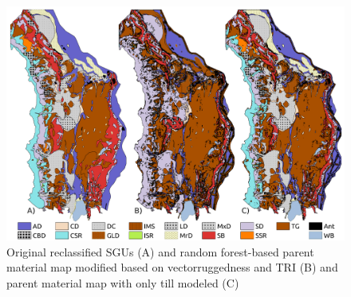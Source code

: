 \documentclass[preprint,12pt,authoryear]{elsarticle}
\begin{document}
 \begin{figure}[ht!]
\includegraphics[width=\textwidth]{SGUandmodel.pdf}
\caption{Original reclassified SGUs (A) and random forest-based parent material map modified based on vectorruggedness and TRI (B) and parent material map with only till modeled (C) }
\label{fig:SGUandmodel}
\end{figure}
\end{document}
